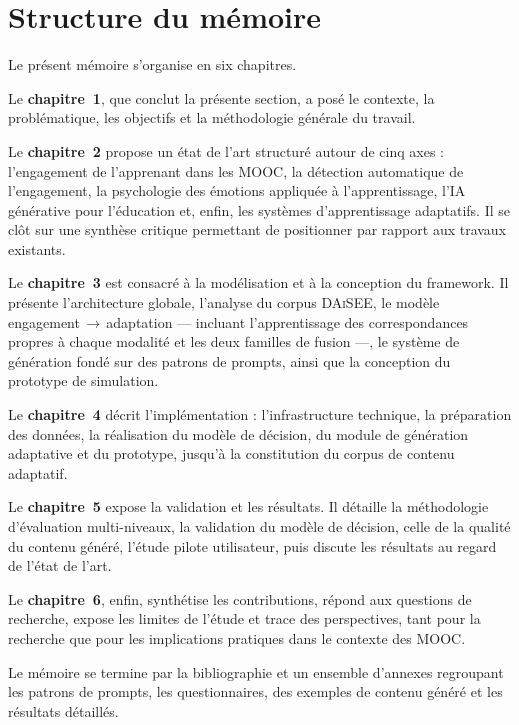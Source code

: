 \section{Structure du mémoire}
\label{sec:structure}

Le présent mémoire s'organise en six chapitres.

Le \textbf{chapitre~1}, que conclut la présente section, a posé le contexte, la
problématique, les objectifs et la méthodologie générale du travail.

Le \textbf{chapitre~2} propose un état de l'art structuré autour de cinq axes :
l'engagement de l'apprenant dans les MOOC, la détection automatique de
l'engagement, la psychologie des émotions appliquée à l'apprentissage, l'IA
générative pour l'éducation et, enfin, les systèmes d'apprentissage adaptatifs.
Il se clôt sur une synthèse critique permettant de positionner \emolearn{} par
rapport aux travaux existants.

Le \textbf{chapitre~3} est consacré à la modélisation et à la conception du
framework. Il présente l'architecture globale, l'analyse du corpus \textsc{DAiSEE},
le modèle engagement\,$\rightarrow$\,adaptation — incluant l'apprentissage des
correspondances propres à chaque modalité et les deux familles de fusion —, le
système de génération fondé sur des patrons de prompts, ainsi que la conception du
prototype de simulation.

Le \textbf{chapitre~4} décrit l'implémentation : l'infrastructure technique, la
préparation des données, la réalisation du modèle de décision, du module de
génération adaptative et du prototype, jusqu'à la constitution du corpus de
contenu adaptatif.

Le \textbf{chapitre~5} expose la validation et les résultats. Il détaille la
méthodologie d'évaluation multi-niveaux, la validation du modèle de décision,
celle de la qualité du contenu généré, l'étude pilote utilisateur, puis discute
les résultats au regard de l'état de l'art.

Le \textbf{chapitre~6}, enfin, synthétise les contributions, répond aux questions
de recherche, expose les limites de l'étude et trace des perspectives, tant pour
la recherche que pour les implications pratiques dans le contexte des MOOC.

Le mémoire se termine par la bibliographie et un ensemble d'annexes regroupant
les patrons de prompts, les questionnaires, des exemples de contenu généré et les
résultats détaillés.
